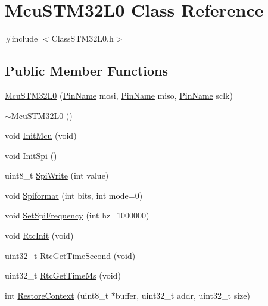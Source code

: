 \hypertarget{class_mcu_s_t_m32_l0}{}\section{Mcu\+S\+T\+M32\+L0 Class Reference}
\label{class_mcu_s_t_m32_l0}


{\ttfamily \#include $<$Class\+S\+T\+M32\+L0.\+h$>$}

\subsection*{Public Member Functions}
\begin{DoxyCompactItemize}
\item 
\mbox{\hyperlink{class_mcu_s_t_m32_l0_ae747db3a6df937b07744e0ba492e1a23}{Mcu\+S\+T\+M32\+L0}} (\mbox{\hyperlink{_class_s_t_m32_l0_8h_a5ceb873075d76667eb54dc6a7d2734d1}{Pin\+Name}} mosi, \mbox{\hyperlink{_class_s_t_m32_l0_8h_a5ceb873075d76667eb54dc6a7d2734d1}{Pin\+Name}} miso, \mbox{\hyperlink{_class_s_t_m32_l0_8h_a5ceb873075d76667eb54dc6a7d2734d1}{Pin\+Name}} sclk)
\item 
\mbox{\hyperlink{class_mcu_s_t_m32_l0_af440c13e851db1f24a3a1b33990495eb}{$\sim$\+Mcu\+S\+T\+M32\+L0}} ()
\item 
void \mbox{\hyperlink{class_mcu_s_t_m32_l0_accd83e34546e9a8e5ad338a3ef5a39a3}{Init\+Mcu}} (void)
\item 
void \mbox{\hyperlink{class_mcu_s_t_m32_l0_a2ea20597a73f4238525debca4014505f}{Init\+Spi}} ()
\item 
uint8\+\_\+t \mbox{\hyperlink{class_mcu_s_t_m32_l0_abd95f830753fd74d9d15b5a441c799dd}{Spi\+Write}} (int value)
\item 
void \mbox{\hyperlink{class_mcu_s_t_m32_l0_a466bd56cae23756c3bfdac88bf0b3ff6}{Spiformat}} (int bits, int mode=0)
\item 
void \mbox{\hyperlink{class_mcu_s_t_m32_l0_a08ba6f34a908e8e118c1f8276dfa767e}{Set\+Spi\+Frequency}} (int hz=1000000)
\item 
void \mbox{\hyperlink{class_mcu_s_t_m32_l0_a58bee4a52ad012eab7691a747f6e1ded}{Rtc\+Init}} (void)
\item 
uint32\+\_\+t \mbox{\hyperlink{class_mcu_s_t_m32_l0_ab71a0e92dc7354fbd49953d6b184af80}{Rtc\+Get\+Time\+Second}} (void)
\item 
uint32\+\_\+t \mbox{\hyperlink{class_mcu_s_t_m32_l0_af661b085d1bba097de819af3a5d0a183}{Rtc\+Get\+Time\+Ms}} (void)
\item 
int \mbox{\hyperlink{class_mcu_s_t_m32_l0_a96a84f57ee2a60edb900505b8c23cf19}{Restore\+Context}} (uint8\+\_\+t $\ast$buffer, uint32\+\_\+t addr, uint32\+\_\+t size)

\end{DoxyCompactItemize}
